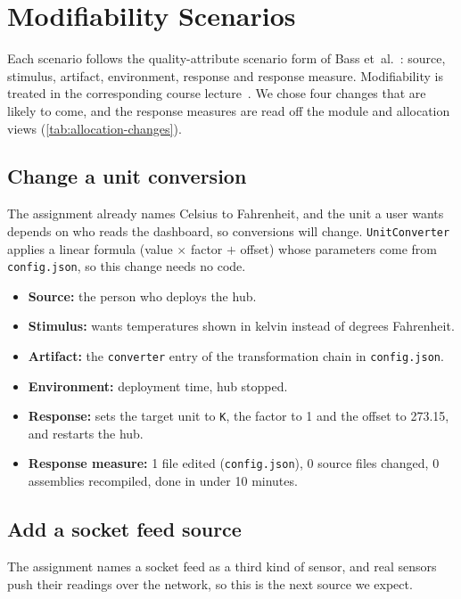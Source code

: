 \documentclass[../main-en.tex]{subfiles}
\begin{document}
\section{Modifiability Scenarios}
\label{sec:modifiability}

Each scenario follows the quality-attribute scenario form of
Bass et~al.~\cite{bass_software_2021}: source, stimulus, artifact,
environment, response and response measure. Modifiability is treated in the
corresponding course lecture~\cite{wiklund_ch8_nodate}. We chose four changes
that are likely to come, and the response measures are read off the module
and allocation views (\cref{tab:allocation-changes}).

\subsection{Change a unit conversion}
\label{sec:scenario-conversion}

The assignment already names Celsius to Fahrenheit, and the unit a user
wants depends on who reads the dashboard, so conversions will change.
\texttt{UnitConverter} applies a linear formula (value $\times$ factor $+$
offset) whose parameters come from \texttt{config.json}, so this change
needs no code.

\begin{itemize}
  \item \textbf{Source:} the person who deploys the hub.
  \item \textbf{Stimulus:} wants temperatures shown in kelvin instead of
  degrees Fahrenheit.
  \item \textbf{Artifact:} the \texttt{converter} entry of the transformation
  chain in \texttt{config.json}.
  \item \textbf{Environment:} deployment time, hub stopped.
  \item \textbf{Response:} sets the target unit to \texttt{K}, the factor to
  1 and the offset to 273.15, and restarts the hub.
  \item \textbf{Response measure:} 1 file edited (\texttt{config.json}),
  0 source files changed, 0 assemblies recompiled, done in under 10 minutes.
\end{itemize}

\subsection{Add a socket feed source}
\label{sec:scenario-socket}

The assignment names a socket feed as a third kind of sensor, and real
sensors push their readings over the network, so this is the next source we
expect.
\end{document}
